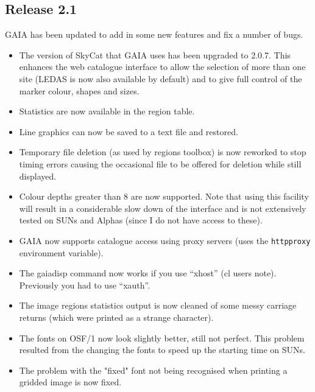 \documentclass[twoside,11pt]{article}
\renewcommand{\_}{\texttt{\symbol{95}}}
\begin{document}
\subsection{Release 2.1}

GAIA has been updated to add in some new features and fix a number of
bugs.
\begin{itemize}
    \item The version of SkyCat that GAIA uses has been upgraded to
      2.0.7. This enhances the web catalogue interface to allow
      the selection of more than one site (LEDAS is now also available
      by default) and to give full control of the marker colour,
      shapes and sizes.

    \item  Statistics are now available in the region table.

    \item  Line graphics can now be saved to a text file and restored.

    \item Temporary file deletion (as used by regions toolbox) is now
      reworked to stop timing errors causing the occasional file to
      be offered for deletion while still displayed.

    \item Colour depths greater than 8 are now supported. Note that using
      this facility will result in a considerable slow down of the
      interface and is not extensively tested on SUNs and Alphas
      (since I do not have access to these).

    \item GAIA now supports catalogue access using proxy servers (uses
      the {\tt http\_proxy} environment variable).

    \item The gaiadisp command now works if you use ``xhost'' (cl users
      note). Previously you had to use ``xauth''.

    \item The image regions statistics output is now cleaned of some messy
      carriage returns (which were printed as a strange character).

    \item The fonts on OSF/1 now look slightly better, still not perfect.
      This problem resulted from the changing the fonts to speed up
      the starting time on SUNs.

    \item The problem with the "fixed" font not being recognised when
      printing a gridded image is now fixed.


\end{itemize}
\end{document}
